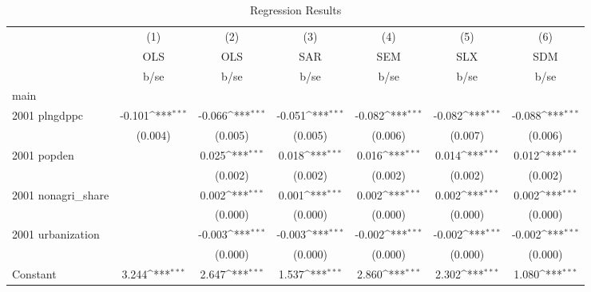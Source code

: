 \begin{table}[htbp]\centering
\def\sym#1{\ifmmode^{#1}\else\(^{#1}\)\fi}
\caption{Regression Results}
\begin{tabular}{l*{6}{c}}
\hline\hline
                    &\multicolumn{1}{c}{(1)}&\multicolumn{1}{c}{(2)}&\multicolumn{1}{c}{(3)}&\multicolumn{1}{c}{(4)}&\multicolumn{1}{c}{(5)}&\multicolumn{1}{c}{(6)}\\
                    &\multicolumn{1}{c}{OLS}&\multicolumn{1}{c}{OLS}&\multicolumn{1}{c}{SAR}&\multicolumn{1}{c}{SEM}&\multicolumn{1}{c}{SLX}&\multicolumn{1}{c}{SDM}\\
                    &        b/se         &        b/se         &        b/se         &        b/se         &        b/se         &        b/se         \\
\hline
main                &                     &                     &                     &                     &                     &                     \\
2001 plngdppc       &      -0.101\sym{***}&      -0.066\sym{***}&      -0.051\sym{***}&      -0.082\sym{***}&      -0.082\sym{***}&      -0.088\sym{***}\\
                    &     (0.004)         &     (0.005)         &     (0.005)         &     (0.006)         &     (0.007)         &     (0.006)         \\
2001 popden         &                     &       0.025\sym{***}&       0.018\sym{***}&       0.016\sym{***}&       0.014\sym{***}&       0.012\sym{***}\\
                    &                     &     (0.002)         &     (0.002)         &     (0.002)         &     (0.002)         &     (0.002)         \\
2001 nonagri\_share  &                     &       0.002\sym{***}&       0.001\sym{***}&       0.002\sym{***}&       0.002\sym{***}&       0.002\sym{***}\\
                    &                     &     (0.000)         &     (0.000)         &     (0.000)         &     (0.000)         &     (0.000)         \\
2001 urbanization   &                     &      -0.003\sym{***}&      -0.003\sym{***}&      -0.002\sym{***}&      -0.002\sym{***}&      -0.002\sym{***}\\
                    &                     &     (0.000)         &     (0.000)         &     (0.000)         &     (0.000)         &     (0.000)         \\
Constant            &       3.244\sym{***}&       2.647\sym{***}&       1.537\sym{***}&       2.860\sym{***}&       2.302\sym{***}&       1.080\sym{***}\\

\end{tabular}
\end{table}

